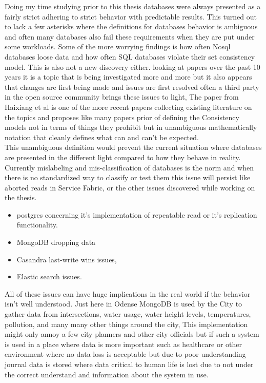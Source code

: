 \documentclass[a4paper,10pt,titlepage]{report}
\begin{document}
Doing my time studying prior to this thesis databases were always presented as a fairly strict adhering to strict behavior with predictable results. This turned out to lack a few asterisks where the definitions for databases behavior is ambiguous and often many databases also fail these requirements when they are put under some workloads. Some of the more worrying findings is how often Nosql databases loose data and how often SQL databases violate their set consistency model. This is also not a new discovery either. looking at papers over the past 10 years it is a topic that is being investigated more and more but it also appears that changes are first being made and issues are first resolved often a third party in the open source community brings these issues to light, The paper from Haixiang et al\cite{li2021coo} is one of the more recent papers collecting existing literature on the topics and proposes like many papers prior of defining the Consistency models not in terms of things they prohibit but in unambiguous mathematically notation that cleanly defines what can and can't be expected.\\
\vspace{5mm}
This unambiguous definition would prevent the current situation where databases are presented in the different light compared to how they behave in reality. Currently mislabeling and mis-classification of databases is the norm and when there is no standardized way to classify or test them this issue will persist like aborted reads in Service Fabric, or the other issues discovered while working on the thesis. \\\vspace{5mm}
\begin{itemize}
    \item postgres concerning it's implementation of repeatable read or it's replication functionality.
    \item MongoDB dropping data
    \item Casandra last-write wins issues, %
    \item Elastic search issues.
\end{itemize}

All of these issues can have huge implications in the real world if the behavior isn't well understood. Just here in Odense MongoDB is used by the City to gather data from intersections, water usage, water height levels, temperatures, pollution, and many many other things around the city, This implementation might only annoy a few city planners and other city officials but if such a system is used in a place where data is more important such as healthcare or other environment where no data loss is acceptable but due to poor understanding journal data is stored where data critical to human life is lost due to not under the correct understand and information about the system in use.
\end{document}
